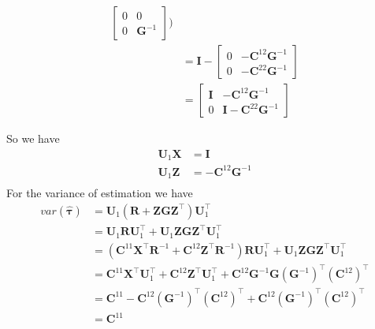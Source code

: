 \documentclass[
  a4paper,
  oneside,
  openany,
  12pt,
  onecolumn]{book}
\theoremstyle{plain}
\theoremstyle{definition}
\theoremstyle{remark}
\begin{document}
\begin{align*}
\begin{bmatrix}
0 & 0 \\
0 & \boldsymbol{G}^{-1}
\end{bmatrix})\\
&=
\boldsymbol{I}-
\begin{bmatrix}
0 & -\boldsymbol{C}^{12}\boldsymbol{G}^{-1} \\
0 & -\boldsymbol{C}^{22}\boldsymbol{G}^{-1}
\end{bmatrix}\\
&=
\begin{bmatrix}
\boldsymbol{I} & -\boldsymbol{C}^{12}\boldsymbol{G}^{-1} \\
0 & \boldsymbol{I}-\boldsymbol{C}^{22}\boldsymbol{G}^{-1}
\end{bmatrix}
\end{align*}

So we have \begin{align*}
\boldsymbol{U}_1\boldsymbol{X}&=\boldsymbol{I}\\
\boldsymbol{U}_1\boldsymbol{Z}&=-\boldsymbol{C}^{12}\boldsymbol{G}^{-1}\\
\end{align*} For the variance of estimation we have \begin{align*}
var(\hat{\boldsymbol{\tau}})
&=
\boldsymbol{U}_1(\boldsymbol{R}+\boldsymbol{ZGZ}^\top)\boldsymbol{U}_1^\top\\
&= \boldsymbol{U}_1\boldsymbol{R}\boldsymbol{U}_1^\top+\boldsymbol{U}_1\boldsymbol{ZGZ}^\top\boldsymbol{U}_1^\top\\
&= (\boldsymbol{C}^{11}\boldsymbol{X}^\top\boldsymbol{R}^{-1}+\boldsymbol{C}^{12}\boldsymbol{Z}^\top\boldsymbol{R}^{-1})\boldsymbol{R}\boldsymbol{U}_1^\top+\boldsymbol{U}_1\boldsymbol{ZGZ}^\top\boldsymbol{U}_1^\top\\
&=\boldsymbol{C}^{11}\boldsymbol{X}^\top\boldsymbol{U}_1^\top+\boldsymbol{C}^{12}\boldsymbol{Z}^\top\boldsymbol{U}_1^\top+\boldsymbol{C}^{12}\boldsymbol{G}^{-1}\boldsymbol{G}(\boldsymbol{G}^{-1})^\top(\boldsymbol{C}^{12})^\top\\
&=\boldsymbol{C}^{11}-\boldsymbol{C}^{12}(\boldsymbol{G}^{-1})^\top(\boldsymbol{C}^{12})^\top+\boldsymbol{C}^{12}(\boldsymbol{G}^{-1})^\top(\boldsymbol{C}^{12})^\top\\
&=\boldsymbol{C}^{11}
\end{align*}
\end{document}
